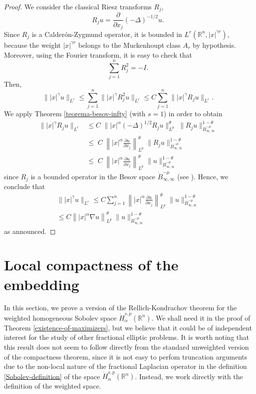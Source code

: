 \documentclass[12pt]{amsart}
\newcommand {\R}{\mathbb{R}}
\begin{document}
\begin{proof}
We consider the classical Riesz transforms $R_j$,
$$ R_j u= \frac{\partial}{\partial x_j} (-\Delta)^{-1/2} u.$$
Since $R_j$ is a Calder\'on-Zygmund operator, it is bounded in $L^r(\R^n,|x|^{\gamma r})$, 
because the weight $|x|^{\gamma r}$ belongs to the Muckenhoupt class $A_r$ by hypothesis. Moreover, using the Fourier 
transform, it is easy to check that
$$ \sum_{j=1}^n R_j^2 = - I.$$
Then, 
$$ \| |x|^\gamma u \|_{L^r} \leq  
\sum_{j=1}^n   \| |x|^\gamma  R_j^2 u \|_{L^r} \leq C \sum_{j=1}^n  
\|  |x|^\gamma  R_j u \|_{L^r}.$$
We apply Theorem \ref{teorema-besov-infty}
 (with $s=1$) in order to obtain 
\begin{align*}
\| |x|^\gamma R_j u  \|_{L^r} & \leq 
C \; \| |x|^{\alpha} (-\Delta)^{1/2} R_j u  \|_{L^p}^\theta \;  \| R_j u \|_{\dot{B}^{-\mu}_{\infty,\infty}}^{1-\theta} \\
& \leq  \; C \; \left \| |x|^{\alpha} \frac{\partial u}{\partial x_j}  \right \|_{L^p}^\theta \;  \| R_j u \|_{\dot{B}^{-\mu}_{\infty,\infty}}^{1-\theta} \\
& \leq  \; C \; \left \| |x|^{\alpha} \frac{\partial u}{\partial x_j}  \right \|_{L^p}^\theta \;  \| u \|_{\dot{B}^{-\mu}_{\infty,\infty}}^{1-\theta}
\end{align*}
since $R_j$ is a bounded operator in the Besov space $\dot{B}^{-\mu}_{\infty,\infty}$ (see \cite{Grafakos}).
Hence, we conclude that 
\begin{align*}
\| |x|^\gamma u \|_{L^r} \leq C \sum_{j=1}^n \left \| |x|^{\alpha} \frac{\partial u}{\partial x_j}  \right \|_{L^p}^\theta \;  \| u \|_{\dot{B}^{-\mu}_{\infty,\infty}}^{1-\theta} \\
\leq C  \left \| |x|^{\alpha} \nabla u  \right \|_{L^p}^\theta \;  \| u \|_{\dot{B}^{-\mu}_{\infty,\infty}}^{1-\theta}
\end{align*}
as announced.
\end{proof}


\section{Local compactness of the embedding}

In this section, we prove a version of the 
Rellich-Kondrachov theorem for the weighted
homogeneous Sobolev space $\dot{H}^{s,p}_\alpha(\R^n)$. We shall need it
in the proof of Theorem \ref{existence-of-maximizers}, but we believe that it could be of
independent interest for the study of other fractional elliptic problems. It is worth 
noting that this result does not seem to follow directly from the standard unweighted version of the compactness theorem, since it is not easy to perfom truncation arguments due to the non-local nature of the fractional Laplacian operator in the definition \eqref{Sobolev-definition} of the space $ \dot{H}^{s,p}_\alpha(\R^n)$. Instead, we work directly with the definition of the weighted space.
\end{document}
